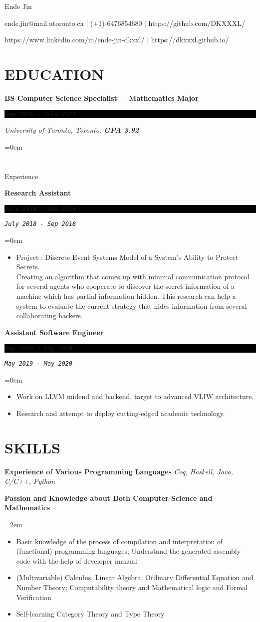 \documentclass[fontsize=11pt]{article}
\newcommand{\MyName}[1]{ %
    \Huge \usefont{OT1}{phv}{b}{n} \hfill #1
    \par \normalsize \normalfont}
\newcommand{\NewPart}[1]{\section*{\uppercase{#1}}}
\newcommand{\SkillEntry}[2]{       %
    \noindent \textbf{#1} \hfill      %
        \noindent \textit{#2} \par        %
}
\newcommand{\SkillsEntry}[4]{       %
    \noindent \textbf{#1} \hfill      %
        \noindent \textit{#2} \par        %
    \noindent\hangindent=2em\hangafter=0 \small #4 %
    \normalsize \par}
\newcommand{\EducationEntry}[4]{
    \noindent \textbf{#1} \hfill      %
    \colorbox{Black}{ 
      \parbox{11em}{
      \centering \color{White}#2}} \par  %
    \noindent \textit{#3} \par        %
    \noindent\hangindent=0em\hangafter=0 \small #4 %
    \normalsize \par}
\newcommand{\WorkEntry}[4]{       %
    \noindent \textbf{#1} \hfill      %
    \colorbox{Black}{%
      \parbox{11em}{%
      \centering\color{White}#2}} \par   %
        \noindent \textit{#2} \par        %
    \noindent\hangindent=0em\hangafter=0 \small #4 %
    \normalsize \par}
\begin{document}
    
\MyName{Ende Jin}
\bigskip
{\small \hfill ende.jin@mail.utoronto.ca | (+1) 6476854680 | https://github.com/DKXXXL/ \par
 \hfill  https://www.linkedin.com/in/ende-jin-dkxxl/ | https://dkxxxl.github.io/}
\NewPart{Education}{}
\EducationEntry
{BS Computer Science Specialist + Mathematics Major}
{ \texttt{Sep 2016 - July 2021} }
{University of Toronto, Toronto.    \bf{GPA 3.92}}

\NewPart{Experience}{}

\WorkEntry
{Research Assistant}
{\texttt{July 2018 - Sep 2018}}
{Fields Institute, Toronto}
{\begin{itemize} \itemsep -1pt
    \item Project : Discrete-Event Systems Model of a System’s Ability to Protect Secrets. 
    \\ Creating an algorithm that comes up with minimal communication protocol for several agents who cooperate to discover the secret information of a machine which has partial information hidden. This research can help a system to evaluate the current strategy that hides information from several collaborating hackers.
    \end{itemize}}
    
\WorkEntry
{Assistant Software Engineer}
{\texttt{May 2019 - May 2020}}
{Huawei Research Center, Toronto}
{\begin{itemize} \itemsep -1pt
    \item Work on LLVM midend and backend, target to advanced VLIW architecture.
    \item Research and attempt to deploy cutting-edged academic technology.  
	\end{itemize}}
\NewPart{Skills}{}
\SkillEntry{Experience of Various Programming Languages}{Coq, Haskell, Java, C/C++, Python}

\SkillsEntry{Passion and Knowledge about Both Computer Science and Mathematics}{}{}{
    \begin{itemize} \itemsep -1pt
        \item Basic knowledge of the process of compilation and interpretation of (functional) programming languages;
        Understand the generated assembly code with the help of developer manual
        \item (Multivariable) Calculus, Linear Algebra, Ordinary Differential Equation and Number Theory; 
        Computability theory and Mathematical logic and Formal Verification
        \item Self-learning Category Theory and Type Theory
    \end{itemize}
}
\end{document}
